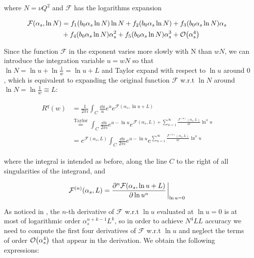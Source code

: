 \documentclass[../main.tex]{subfiles}
\begin{document}
where $N=\nu Q^2$ and $\mathcal{F}$ has the logarithms expansion

\begin{align}
    \begin{split}
    \mathcal{F}(\alpha_s,\ln N) &= f_1(b_0 \alpha_s \ln N) \ln N + f_2(b_0 \alpha_s \ln N) + f_3(b_0 \alpha_s \ln N) \alpha_s \\
    &+ f_4(b_0 \alpha_s \ln N) \alpha_s^2 + f_5(b_0 \alpha_s \ln N) \alpha_s^3 + \order{\alpha_s^4}
\end{split}
\end{align}

Since the function $\mathcal{F}$ in the exponent varies more slowly with N than $wN$, we can introduce the integration variable $u=wN$
so that $\ln N = \ln u +\ln \frac{1}{w} = \ln u + L$ and Taylor expand with respect to $\ln u$ around $0$, which is equivalent to expanding 
the original function $\mathcal{F}$ w.r.t $\ln N$ around $\ln N = \ln \frac{1}{w}\equiv L$:

\begin{align}
    \begin{split}\label{eq:Rw expansion}
       R^q(w) &= \frac{1}{2\pi i} \int_C \frac{\dd u}{u} e^{u} e^{\mathcal{F}(\alpha_s,\ln u + L)} \\
       &\stackrel{\text{Taylor}}{=} \int_C \frac{\dd u}{2\pi i} e^{u-\ln u} e^{\mathcal{F}(\alpha_s,L)+\sum_{n=1}^\infty \frac{\mathcal{F}^{(n)}(\alpha_s,L)}{n!}  \ln^n u}\\
       &= e^{\mathcal{F}(\alpha_s,L)} \int_C \frac{\dd u}{2\pi i} e^{u-\ln u} e^{\sum_{n=1}^\infty \frac{\mathcal{F}^{(n)}(\alpha_s,L)}{n!}  \ln^n u}
    \end{split}
\end{align}

where the integral is intended as before, along the line $C$ to the right of all singularities of the integrand, and 

\begin{equation}
    \mathcal{F}^{(n)}(\alpha_s,L) = \pdv[n]{\mathcal{F}(\alpha_s,\ln u + L )}{\ln u} \eval_{\ln u = 0}
\end{equation}

As noticed in \cite{CATANI19933}, the $n$-th derivative of $\mathcal{F}$ w.r.t $\ln u$ evaluated at $\ln u = 0$ is 
at most of logarithmic order $\alpha_s^{n+k-1}L^k$, so in order to achieve $N^4LL$ accuracy we need to compute the first four derivatives of $\mathcal{F}$ w.r.t $\ln u$ and 
neglect the terms of order $\order{\alpha_s^4}$ that appear in the derivation. We obtain the following expressions: 
\end{document}

